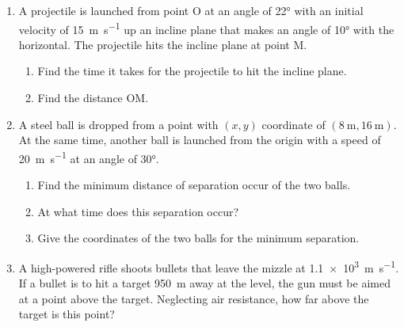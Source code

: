 \documentclass{../../../oss-apphys}
\begin{document}
\begin{enumerate}[leftmargin=15pt]
\begin{center}

  \end{center}
  \newpage

\item A projectile is launched from point O at an angle of \ang{22} with an
  initial velocity of \SI{15}{\metre\per\second} up an incline plane that makes
  an angle of \ang{10} with the horizontal. The projectile hits the incline
  plane at point M.
  \begin{center}
  \end{center}
  \begin{enumerate}[noitemsep,topsep=0pt]
  \item Find the time it takes for the projectile to hit the incline plane.
  \item Find the distance OM.
  \end{enumerate}
  \vspace{1.75in}
  
\item A steel ball is dropped from a point with $(x,y)$ coordinate of
  $(\SI{8}{\metre},\SI{16}{\metre})$. At the same time, another ball is launched
  from the origin with a speed of \SI{20}{\metre\per\second} at an angle of
  \ang{30}.
  \begin{enumerate}[noitemsep,topsep=0pt]
  \item Find the minimum distance of separation occur of the two balls.
  \item At what time does this separation occur?
  \item Give the coordinates of the two balls for the minimum separation.
  \end{enumerate}
  \newpage

\item A high-powered rifle shoots bullets that leave the mizzle at
  \SI{1.1e3}{\metre\per\second}. If a bullet is to hit a target
  \SI{950}{\metre} away at the level, the gun must be aimed at a point above
  the target. Neglecting air resistance, how far above the target is this
  point? 
  \vspace{2.5in}


\end{enumerate}
\end{document}
